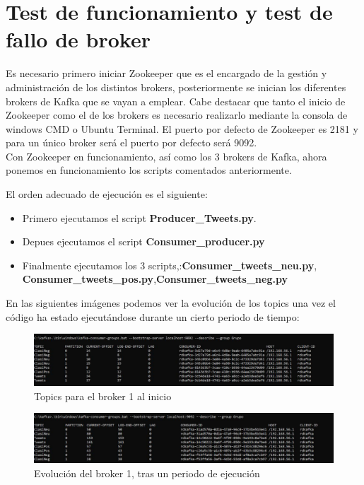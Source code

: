 \documentclass[12pt, a4paper, twoside]{article}
\begin{document}
\section{Test de funcionamiento y test de fallo de broker}

Es necesario primero iniciar Zookeeper que es el encargado de la gestión y administración de los distintos brokers, posteriormente se inician los diferentes brokers de Kafka que se vayan a emplear.
Cabe destacar que tanto el inicio de Zookeeper como el de los brokers es necesario realizarlo mediante la consola de windows CMD o Ubuntu Terminal.
El puerto por defecto de Zookeeper es 2181 y para un único broker será el puerto por defecto será 9092.\\

Con Zookeeper en funcionamiento, así como los 3 brokers de Kafka, ahora ponemos en funcionamiento los scripts comentados anteriormente.

El orden adecuado de ejecución es el siguiente:
\begin{itemize}
\item Primero ejecutamos el script \textbf{Producer\_Tweets.py}.
\item Depues ejecutamos el script  \textbf{Consumer\_producer.py}
\item Finalmente ejecutamos los 3 scripts,:\textbf{Consumer\_tweets\_neu.py},\\ \textbf{Consumer\_tweets\_pos.py},\textbf{Consumer\_tweets\_neg.py}
\end{itemize}

En las siguientes imágenes podemos ver la evolución de los topics una vez el código ha estado ejecutándose durante un cierto periodo de tiempo:


\begin{figure}[h]
		\centering
		\includegraphics[width=1.1\linewidth]{inicio_codigo}
		\caption{Topics para el broker 1 al inicio}
			\end{figure}
			
			
\begin{figure}[h]
		\centering
		\includegraphics[width=1.1\linewidth]{intermedio_codigo}
		\caption{Evolución del broker 1, tras un periodo de ejecución}
			\end{figure}
\end{document}
